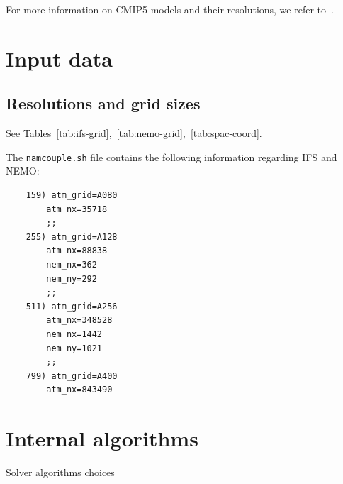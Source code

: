 For more information on CMIP5 models and their resolutions, we refer to~\cite{cmip5}.

\section{Input data}

\subsection{Resolutions and grid sizes}
See Tables~\ref{tab:ifs-grid},~\ref{tab:nemo-grid},~\ref{tab:spac-coord}.

The \texttt{namcouple.sh} file contains the following information regarding IFS and NEMO:

\begin{lstlisting}
    159) atm_grid=A080
        atm_nx=35718
        ;;
    255) atm_grid=A128
        atm_nx=88838
        nem_nx=362
        nem_ny=292
        ;;
    511) atm_grid=A256
        atm_nx=348528
        nem_nx=1442
        nem_ny=1021
        ;;
    799) atm_grid=A400
        atm_nx=843490  
\end{lstlisting}








\section{Internal algorithms}
Solver algorithms choices